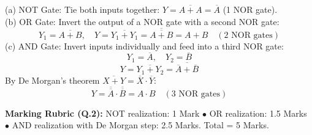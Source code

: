\begin{solutionbox}[Solution to Q.2]
(a) NOT Gate: Tie both inputs together: $Y = \overline{A + A} = \overline{A}$ (1 NOR gate).\\
(b) OR Gate: Invert the output of a NOR gate with a second NOR gate:
\[ Y_1 = \overline{A + B}, \quad Y = \overline{Y_1 + Y_1} = \overline{\overline{A + B}} = A + B \quad (\text{2 NOR gates}) \]
(c) AND Gate: Invert inputs individually and feed into a third NOR gate:
\[ Y_1 = \overline{A}, \quad Y_2 = \overline{B} \]
\[ Y = \overline{Y_1 + Y_2} = \overline{\overline{A} + \overline{B}} \]
By De Morgan's theorem $\overline{X + Y} = \overline{X} \cdot \overline{Y}$:\\
\[ Y = \overline{\overline{A}} \cdot \overline{\overline{B}} = A \cdot B \quad (\text{3 NOR gates}) \]
\end{solutionbox}
\begin{markingrubric}
\textbf{Marking Rubric (Q.2):} NOT realization: 1 Mark $\bullet$ OR realization: 1.5 Marks $\bullet$ AND realization with De Morgan step: 2.5 Marks. Total = 5 Marks.
\end{markingrubric}
\newpage
